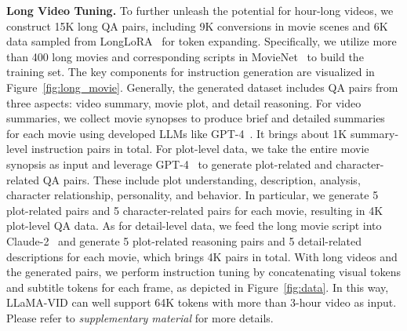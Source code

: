 \vspace{0.5em}
\noindent
\textbf{Long Video Tuning.} 
To further unleash the potential for hour-long videos, we construct 15K long QA pairs, including 9K conversions in movie scenes and 6K data sampled from LongLoRA~\cite{longlora} for token expanding.
Specifically, we utilize more than 400 long movies and corresponding scripts in MovieNet~\cite{movienet} to build the training set.
The key components for instruction generation are visualized in Figure~\ref{fig:long_movie}.
Generally, the generated dataset includes QA pairs from three aspects: video summary, movie plot, and detail reasoning. 
For video summaries, we collect movie synopses to produce brief and detailed summaries for each movie using developed LLMs like GPT-4~\cite{GPT4}. 
It brings about 1K summary-level instruction pairs in total.
For plot-level data, we take the entire movie synopsis as input and leverage GPT-4~\cite{GPT4} to generate plot-related and character-related QA pairs.
These include plot understanding, description, analysis, character relationship, personality, and behavior. 
In particular, we generate 5 plot-related pairs and 5 character-related pairs for each movie, resulting in 4K plot-level QA data.
As for detail-level data, we feed the long movie script into Claude-2~\cite{Claude2} and generate 5 plot-related reasoning pairs and 5 detail-related descriptions for each movie, which brings 4K pairs in total.
With long videos and the generated pairs, we perform instruction tuning by concatenating visual tokens and subtitle tokens for each frame, as depicted in Figure~\ref{fig:data}.
In this way, LLaMA-VID can well support 64K tokens with more than 3-hour video as input.
Please refer to {\em supplementary material} for more details.

